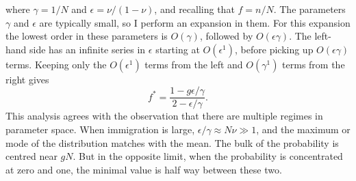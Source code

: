 where $\gamma = 1/N$ and $\epsilon = \nu/(1-\nu)$, and recalling that $f=n/N$. 
The parameters $\gamma$ and $\epsilon$ are typically small, so I perform an expansion in them. 
For this expansion the lowest order in these parameters is $O(\gamma)$, followed by $O(\epsilon\gamma)$. 
The left-hand side has an infinite series in $\epsilon$ starting at $O(\epsilon^1)$, before picking up $O(\epsilon\gamma)$ terms. 
Keeping only the $O(\epsilon^1)$ terms from the left and $O(\gamma^1)$ terms from the right gives
\begin{equation}
	f^* = \frac{1-g\epsilon/\gamma}{2-\epsilon/\gamma}. %
\end{equation}
This analysis agrees with the observation that there are multiple regimes in parameter space. 
When immigration is large, $\epsilon/\gamma \approx N\nu \gg 1$, and the maximum or mode of the distribution matches with the mean. 
The bulk of the probability is centred near $g N$. 
But in the opposite limit, when the probability is concentrated at zero and one, the minimal value is half way between these two. 

